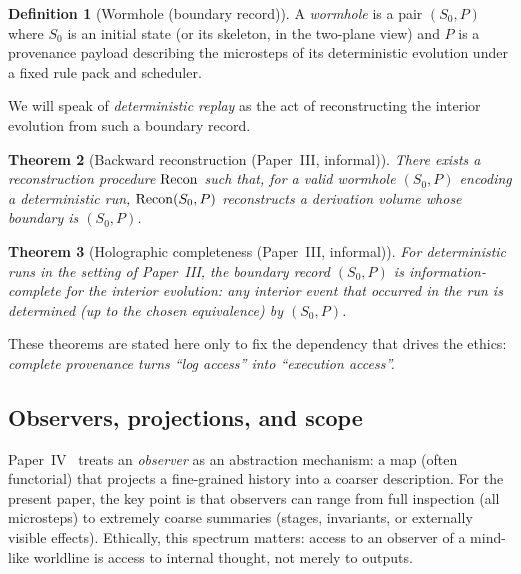 \documentclass[11pt]{article}
\theoremstyle{definition}
\newtheorem{definition}{Definition}[section]
\theoremstyle{plain}
\newtheorem{theorem}[definition]{Theorem}
\theoremstyle{remark}
\DeclareRobustCommand{\WARP}{\ifmmode\mathit{WARP}\else{\upshape\scshape warp}\fi}
\begin{document}
\begin{definition}[Wormhole (boundary record)]
A \emph{wormhole} is a pair $(S_0,P)$ where $S_0$ is an initial \WARP{} state (or its skeleton, in the
two-plane view) and $P$ is a provenance payload describing the microsteps of its deterministic
evolution under a fixed rule pack and scheduler.
\end{definition}

We will speak of \emph{deterministic replay} as the act of reconstructing the interior evolution
from such a boundary record.

\begin{theorem}[Backward reconstruction (Paper~III, informal)]
\label{thm:backward}
There exists a reconstruction procedure $\operatorname{Recon}$ such that, for a valid wormhole $(S_0,P)$ encoding a
deterministic run, $\operatorname{Recon}(S_0,P)$ reconstructs a derivation volume whose boundary is $(S_0,P)$.
\end{theorem}

\begin{theorem}[Holographic completeness (Paper~III, informal)]
\label{thm:holography}
For deterministic runs in the setting of Paper~III, the boundary record $(S_0,P)$ is information-complete
for the interior evolution: any interior event that occurred in the run is determined (up to the chosen
equivalence) by $(S_0,P)$.
\end{theorem}

These theorems are stated here only to fix the dependency that drives the ethics: \emph{complete
provenance turns ``log access'' into ``execution access''.}

\subsection{Observers, projections, and scope}
\label{sec:rulial}

Paper~IV~\cite{ross_paper_iv} treats an \emph{observer} as an abstraction mechanism: a map (often functorial) that projects a
fine-grained history into a coarser description.
For the present paper, the key point is that observers can range from full inspection (all microsteps)
to extremely coarse summaries (stages, invariants, or externally visible effects).
Ethically, this spectrum matters: access to an observer of a mind-like worldline is access to internal
thought, not merely to outputs.
\end{document}
